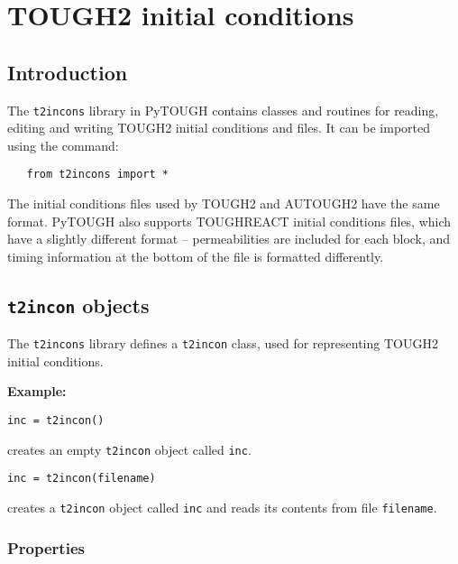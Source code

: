 \chapter{TOUGH2 initial conditions}
\label{incons}

\section{Introduction}
The \texttt{t2incons} library in PyTOUGH contains classes and routines for reading, editing and writing TOUGH2 initial conditions and files.  It can be imported using the command:

\begin{lstlisting}
   from t2incons import *
\end{lstlisting}

The initial conditions files used by TOUGH2 and AUTOUGH2 have the same format.  PyTOUGH also supports TOUGHREACT initial conditions files, which have a slightly different format -- permeabilities are included for each block, and timing information at the bottom of the file is formatted differently.

\section{\texttt{t2incon} objects}

The \texttt{t2incons} library defines a \texttt{t2incon} class, used for representing TOUGH2 initial conditions.

\textbf{Example:}

\begin{lstlisting}
inc = t2incon()
\end{lstlisting}

creates an empty \texttt{t2incon} object called \texttt{inc}.

\begin{lstlisting}
inc = t2incon(filename)
\end{lstlisting}

creates a \texttt{t2incon} object called \texttt{inc} and reads its contents from file \texttt{filename}.

\subsection{Properties}

